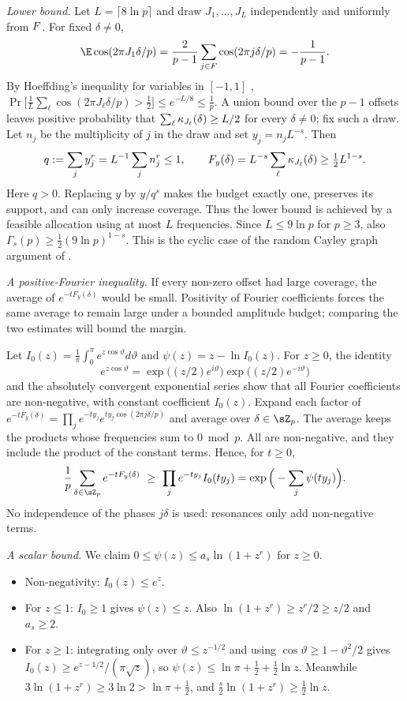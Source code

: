 \emph{Lower bound.} Let $L=\lceil8\ln p\rceil$ and draw $J_1,\dots,J_L$ independently and uniformly from $F$. For fixed $\delta\neq0$,
\[
\E\cos(2\pi J_1\delta/p)=\frac2{p-1}\sum_{j\in\Fp}\cos(2\pi j\delta/p)=-\frac1{p-1}.
\]
By Hoeffding's inequality for variables in $[-1,1]$ \citep{hoeffding1963probability}, $\Pr\big[\frac1L\sum_\ell\cos(2\pi J_\ell\delta/p)>\frac12\big]\le e^{-L/8}\le\frac1p$. A union bound over the $p-1$ offsets leaves positive probability that $\sum_\ell\kappa_{J_\ell}(\delta)\ge L/2$ for every $\delta\neq0$; fix such a draw.
Let $n_j$ be the multiplicity of $j$ in the draw and set $y_j=n_jL^{-s}$. Then
\[
q:=\sum_jy_j^r=L^{-1}\sum_jn_j^r\le1,
\qquad
F_y(\delta)=L^{-s}\sum_\ell\kappa_{J_\ell}(\delta)\ge\tfrac12L^{1-s}.
\]
Here $q>0$. Replacing $y$ by $y/q^s$ makes the budget exactly one, preserves its support, and can only increase coverage. Thus the lower bound is achieved by a feasible allocation using at most $L$ frequencies. Since $L\le9\ln p$ for $p\ge3$, also $\Gamma_s(p)\ge\frac12(9\ln p)^{1-s}$. This is the cyclic case of the random Cayley graph argument of \citet{alon1994random}.

\emph{A positive-Fourier inequality.} If every non-zero offset had large coverage, the average of $e^{-tF_y(\delta)}$ would be small. Positivity of Fourier coefficients forces the same average to remain large under a bounded amplitude budget; comparing the two estimates will bound the margin.

Let $I_0(z)=\frac1\pi\int_0^\pi e^{z\cos\vartheta}d\vartheta$ and $\psi(z)=z-\ln I_0(z)$. For $z\ge0$, the identity
\[
e^{z\cos\vartheta}=\exp\big((z/2)e^{i\vartheta}\big)\exp\big((z/2)e^{-i\vartheta}\big)
\]
and the absolutely convergent exponential series show that all Fourier coefficients are non-negative, with constant coefficient $I_0(z)$. Expand each factor of $e^{-tF_y(\delta)}=\prod_je^{-ty_j}e^{ty_j\cos(2\pi j\delta/p)}$ and average over $\delta\in\sZ_p$. The average keeps the products whose frequencies sum to $0\bmod p$. All are non-negative, and they include the product of the constant terms. Hence, for $t\ge0$,
\begin{equation}
\frac1p\sum_{\delta\in\sZ_p}e^{-tF_y(\delta)}\ \ge\ \prod_je^{-ty_j}I_0(ty_j)=\exp\Big(-\sum_j\psi(ty_j)\Big).
\label{eq:posfourier}
\end{equation}
No independence of the phases $j\delta$ is used: resonances only add non-negative terms.

\emph{A scalar bound.} We claim $0\le\psi(z)\le a_s\ln(1+z^r)$ for $z\ge0$.
\begin{itemize}
\item Non-negativity: $I_0(z)\le e^z$.
\item For $z\le1$: $I_0\ge1$ gives $\psi(z)\le z$. Also $\ln(1+z^r)\ge z^r/2\ge z/2$ and $a_s\ge2$.
\item For $z\ge1$: integrating only over $\vartheta\le z^{-1/2}$ and using $\cos\vartheta\ge1-\vartheta^2/2$ gives $I_0(z)\ge e^{z-1/2}/(\pi\sqrt z)$, so $\psi(z)\le\ln\pi+\frac12+\frac12\ln z$. Meanwhile $3\ln(1+z^r)\ge3\ln2>\ln\pi+\frac12$, and $\frac s2\ln(1+z^r)\ge\frac12\ln z$.
\end{itemize}

